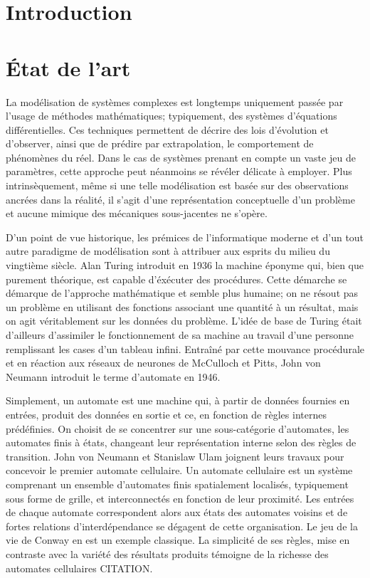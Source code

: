 \documentclass[10pt]{article}
\begin{document}
\begin{multicols}{2}

\section{Introduction}

\section{\'Etat de l'art}

La modélisation de systèmes complexes est longtemps uniquement passée
par l'usage de méthodes mathématiques; typiquement, des systèmes
d'équations différentielles. Ces techniques permettent de décrire des
lois d'évolution et d'observer, ainsi que de prédire par
extrapolation, le comportement de phénomènes du réel. Dans le cas de
systèmes prenant en compte un vaste jeu de paramètres, cette approche
peut néanmoins se révéler délicate à employer. Plus intrinsèquement,
même si une telle modélisation est basée sur des observations ancrées
dans la réalité, il s'agit d'une représentation conceptuelle d'un
problème et aucune mimique des mécaniques sous-jacentes ne s'opère.

D'un point de vue historique, les prémices de l'informatique moderne
et d'un tout autre paradigme de modélisation sont à attribuer aux
esprits du milieu du vingtième siècle. Alan Turing introduit en 1936
la machine éponyme qui, bien que purement théorique, est capable
d'éxécuter des procédures. Cette démarche se démarque de l'approche
mathématique et semble plus humaine; on ne résout pas un problème en
utilisant des fonctions associant une quantité à un résultat, mais on
agit véritablement sur les données du problème. L'idée de base de
Turing était d'ailleurs d'assimiler le fonctionnement de sa machine au
travail d'une personne remplissant les cases d'un tableau
infini. Entraîné par cette mouvance procédurale et en réaction aux
réseaux de neurones de McCulloch et Pitts, John von Neumann introduit
le terme d'automate en 1946.

Simplement, un automate est une machine qui, à partir de données
fournies en entrées, produit des données en sortie et ce, en fonction
de règles internes prédéfinies. On choisit de se concentrer sur une
sous-catégorie d'automates, les automates finis à états, changeant
leur représentation interne selon des règles de transition. John von
Neumann et Stanislaw Ulam joignent leurs travaux pour concevoir le
premier automate cellulaire. Un automate cellulaire est un système
comprenant un ensemble d'automates finis spatialement localisés,
typiquement sous forme de grille, et interconnectés en fonction de
leur proximité. Les entrées de chaque automate correspondent alors aux
états des automates voisins et de fortes relations d'interdépendance
se dégagent de cette organisation. Le jeu de la vie de Conway en est
un exemple classique. La simplicité de ses règles, mise en contraste
avec la variété des résultats produits témoigne de la richesse des
automates cellulaires CITATION.


\end{multicols}
\end{document}

